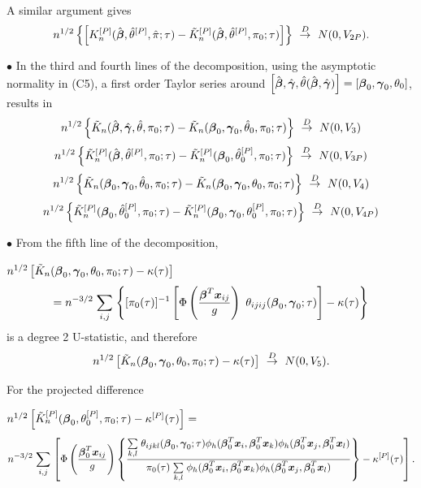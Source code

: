 \documentclass[12pt]{article}
\newcommand{\bmx}{\mbox{\boldmath $x$}}
\newcommand{\bg}{\mbox{\boldmath $\gamma$}}
\newcommand{\bb}{\mbox{\boldmath $\beta$}}
\def\stackunder#1#2{\mathrel{\mathop{#2}\limits_{#1}}}
\begin{document}
\noindent A similar argument gives
\[ n^{1/2} \left\{ \left[ K_n^{[P]}(\hat{\bb}, \hat{\theta}^{[P]},\hat{\pi};\tau) - \tilde{K}_n^{[P]}(\hat{\bb}, \hat{\theta}^{[P]},\pi_0;\tau) \right]  \right\} \ \stackrel{D}{\rightarrow} \ N(0, V_{2P}) .\]

\vskip 0.25in

\noindent $ \bullet$  In the third and fourth lines of the decomposition, using the asymptotic normality in (C5), a first order Taylor series around $\left[\hat{\bb}, \hat{\bg}, \hat{\theta}(\hat{\bb},\hat{\bg}) \right]  = \left[\bb_0, \bg_0, \theta_0 \right]$, results in 
\[n^{1/2} \left\{ \tilde{K}_n(\hat{\bb},\hat{\bg}, \hat{\theta},\pi_0;\tau) - \tilde{K}_n(\bb_0,\bg_0, \hat{\theta}_0,\pi_0;\tau)  \right\} \ \stackrel{D}{\rightarrow} \ N(0, V_{3})\]
\[n^{1/2} \left\{\tilde{K}_n^{[P]}(\hat{\bb}, \hat{\theta}^{[P]},\pi_0;\tau) - \tilde{K}_n^{[P]}(\bb_0, \hat{\theta}^{[P]}_0,\pi_0;\tau) \right\} \ \stackrel{D}{\rightarrow} \ N(0, V_{3P})\]
\[ n^{1/2} \left\{ \tilde{K}_n(\bb_0,\bg_0, \hat{\theta}_0,\pi_0;\tau) - \tilde{K}_n(\bb_0,\bg_0, \theta_0,\pi_0;\tau)  \right\} \ \stackrel{D}{\rightarrow} \ N(0, V_{4})\]
\[n^{1/2} \left\{ \tilde{K}_n^{[P]}(\bb_0, \hat{\theta}^{[P]}_0,\pi_0;\tau) - \tilde{K}_n^{[P]}(\bb_0,\bg_0, \theta^{[P]}_0,\pi_0;\tau) \right\} \ \stackrel{D}{\rightarrow} \ N(0, V_{4P})\]
 

\vskip 0.25in


\noindent $\bullet$ From the fifth line of the decomposition, 

\noindent $n^{1/2} \left[\tilde{K}_n(\bb_0,\bg_0, \theta_0,\pi_0;\tau) - \kappa(\tau) \right] $
\[ = n^{-3/2} \stackunder{i, j }{\sum} \left\{ [\pi_0(\tau)]^{-1} \left[\Phi \left(\frac{\bb^T\bmx_{ij} }{g} \right)  \ \theta_{ijij}(\bb_0,\bg_0;\tau) \right] - \kappa(\tau) \right\} \]
is a degree 2 U-statistic, and therefore
\[ n^{1/2} \left[\tilde{K}_n(\bb_0,\bg_0, \theta_0,\pi_0;\tau) - \kappa(\tau) \right]\ \stackrel{D}{\rightarrow} \ N(0, V_{5}) .\]   

\bigskip
\noindent For the projected difference

\noindent $n^{1/2}\left[ \tilde{K}_n^{[P]}(\bb_0, \theta^{[P]}_0,\pi_0;\tau) - \kappa^{[P]}(\tau) \right]  = $ \small
\[  n^{-3/2}  \stackunder{i, j }{\sum} \left[ \Phi \left(\frac{\bb_0^T\bmx_{ij} }{g} \right)  \left\{ \frac{  \stackunder{k, l }{\sum} \theta_{ijkl}(\bb_0,\bg_0; \tau) \phi_h(\bb_0^T\bmx_{i},\bb_0^T\bmx_{k}) \phi_h(\bb_0^T\bmx_{j},\bb_0^T\bmx_{l}) }
 { \pi_0(\tau) \stackunder{k, l}{\sum} \phi_h(\bb_0^T\bmx_{i},\bb_0^T\bmx_{k}) \phi_h(\bb_0^T\bmx_{j},\bb_0^T\bmx_{l})} \right\}  - \kappa^{[P]}(\tau)\right] .\] \normalsize
\end{document}

